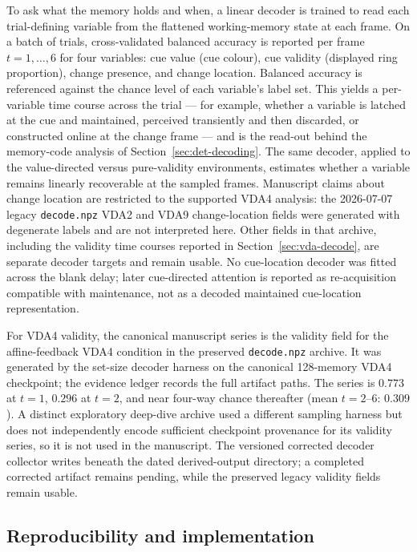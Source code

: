 To ask what the memory holds and when, a linear decoder is trained to read
each trial-defining variable from the flattened working-memory state at
each frame. On a batch of trials, cross-validated balanced accuracy is
reported per frame $t = 1, \dots, 6$ for four variables: cue value (cue
colour), cue validity (displayed ring proportion), change presence, and
change location. Balanced accuracy is referenced against the chance level
of each variable's label set. This yields a per-variable time course
across the trial --- for example, whether a variable is latched at the cue
and maintained, perceived transiently and then discarded, or constructed
online at the change frame --- and is the read-out behind the memory-code
analysis of Section~\ref{sec:det-decoding}. The same decoder, applied to
the value-directed versus pure-validity environments, estimates whether a
variable remains linearly recoverable at the sampled frames. Manuscript claims
about change location are restricted to the supported VDA4 analysis: the
2026-07-07 legacy \texttt{decode.npz} VDA2 and VDA9 change-location fields were
generated with degenerate labels and are not interpreted here. Other fields in
that archive, including the validity time courses reported in
Section~\ref{sec:vda-decode}, are separate decoder targets and remain usable.
No cue-location decoder was fitted across the blank delay; later cue-directed
attention is reported as re-acquisition compatible with maintenance, not as a
decoded maintained cue-location representation.

For VDA4 validity, the canonical manuscript series is the validity field for the
affine-feedback VDA4 condition in the preserved \texttt{decode.npz} archive. It
was generated by the set-size decoder harness on the canonical 128-memory VDA4
checkpoint; the evidence ledger records the full artifact paths. The series is
$0.773$ at $t=1$, $0.296$ at $t=2$, and near four-way chance thereafter
(mean $t=2$--$6$: $0.309$). A distinct exploratory deep-dive archive used a
different sampling harness but does not independently encode sufficient checkpoint
provenance for its validity series, so it is not used in the manuscript. The
versioned corrected decoder collector writes beneath the dated derived-output
directory; a completed corrected artifact remains pending, while the preserved
legacy validity fields remain usable.

\subsection{Reproducibility and implementation}
\label{sec:methods-repro}

